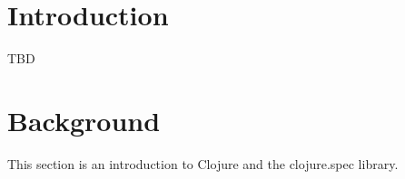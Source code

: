 \documentclass[12pt]{article}
\begin{document}


\newpage
\setcounter{page}{1}

\section{Introduction}
TBD

\section{Background}
	This section is an introduction to Clojure and the clojure.spec library. 
\end{document}
